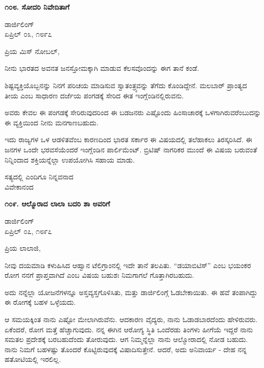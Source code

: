\begin{center}
\textbf{೧೦೮. ಸೋದರಿ ನಿವೇದಿತಾಗೆ}
\end{center}

\begin{flushright}
ಡಾರ್ಜಿಲಿಂಗ್\\ಏಪ್ರಿಲ್ ೦೩, ೧೮೯೭
\end{flushright}

ಪ್ರಿಯ ಮಿಸ್ ನೋಬಲ್,

ನೀನು ಭಾರತದ ಅವನತ ಜನಸ್ತೋಮಕ್ಕಾಗಿ ಮಾಡುವ ಕೆಲಸವೊಂದನ್ನು ಈಗ ತಾನೆ ಕಂಡೆ.

ಶಿಷ್ಟವ್ಯಕ್ತಿಯೊಬ್ಬನನ್ನು ನಿನಗೆ ಪರಿಚಯ ಮಾಡಿಸುವ ಸ್ವಾತಂತ್ರ್ಯವನ್ನು ತೆಗೆದು ಕೊಂಡಿದ್ದೇನೆ. ಮಲಬಾರ್ ಪ್ರಾಂತ್ಯದ ತೀಯ ಎಂಬ ಸಾಧಾರಣ ದರ್ಜೆಯ ಪಂಗಡಕ್ಕೆ ಸೇರಿದ ಈತ ಇಂಗ್ಲೆಂಡಿನಲ್ಲಿರುವನು.

ಅವರು ಕೇವಲ ಈ ಪಂಗಡಕ್ಕೆ ಸೇರಿರುವುದರಿಂದ ಈ ಬಡಜನರು ಎಷ್ಟೊಂದು ಹಿಂಸಾಚಾರಕ್ಕೆ ಒಳಗಾಗಿರುವರೆಂಬುದನ್ನು ಈ ವ್ಯಕ್ತಿಯಿಂದ ನೀನು ಮನಗಾಣಬಹುದು.

ಇದು ರಾಜ್ಯಗಳ ಒಳ ಆಡಳಿತವೆಂಬ ಕಾರಣದಿಂದ ಭಾರತ ಸರ್ಕಾರ ಈ ವಿಷಯದಲ್ಲಿ ತಲೆಹಾಕಲು ತಿರಸ್ಕರಿಸಿದೆ. ಈ ಜನಗಳ ಒಂದೇ ಭರವಸೆಯೆಂದರೆ ಇಂಗ್ಲೆಂಡಿನ ಪಾರ್ಲಿಮೆಂಟ್. ಬ್ರಿಟಿಷ್ ನಾಗರಿಕರ ಮುಂದೆ ಈ ವಿಷಯ ಬರುವಂತೆ ನಿನ್ನಿಂದಾದ ಶಕ್ತಿಯನ್ನೆಲ್ಲಾ ಉಪಯೋಗಿಸಿ ಸಹಾಯ ಮಾಡು.

\begin{flushright}
ಸತ್ಯದಲ್ಲಿ ಎಂದಿಗೂ ನಿನ್ನವನಾದ\\ವಿವೇಕಾನಂದ
\end{flushright}

\begin{center}
\textbf{೧೦೯. ಆಲ್ಮೊರಾದ ಲಾಲಾ ಬದರಿ ಶಾ ಅವರಿಗೆ}
\end{center}

\begin{flushright}
ಡಾರ್ಜಿಲಿಂಗ್\\ಏಪ್ರಿಲ್ ೦೭, ೧೮೯೭
\end{flushright}

ಪ್ರಿಯ ಲಾಲಾಜಿ,

ನೀವು ದಯಮಾಡಿ ಕಳುಹಿಸಿದ ಆಹ್ವಾನ ಟೆಲಿಗ್ರಾಂನಲ್ಲಿ ಇದೇ ತಾನೆ ತಲಪಿತು. “ಡಯಾಬಿಟಿಸ್” ಎಂಬ ಭಯಂಕರ ರೋಗ ನನಗೆ ಪ್ರಾಪ್ತವಾಗಿದೆ ಎಂಬ ವಿಷಯ ಬಹುಶಃ ನಿಮಗಾಗಲೆ ಗೊತ್ತಾಗಿರಬಹುದು.

ಅದು ನನ್ನೆಲ್ಲಾ ಯೋಜನೆಗಳನ್ನೂ ಅಸ್ತವ್ಯಸ್ತಗೊಳಿಸಿತು, ಮತ್ತು ಡಾರ್ಜಿಲಿಂಗ್ಗೆ ಓಡಬೇಕಾಯಿತು. ಈ ಹವೆ ತಂಪಾಗಿದ್ದು ಈ ರೋಗಕ್ಕೆ ಬಹಳ ಒಳ್ಳೆಯದು.

ಆ ಸಮಯಕ್ಕಿಂತ ನಾನು ಎಷ್ಟೋ ಮೇಲಾಗಿರುವೆನು. ಆದಕಾರಣ ವೈದ್ಯರು, ನಾನು ಓಡಾಡಬಾರದೆಂದು ಹೇಳಿರುವರು. ಏಕೆಂದರೆ, ರೋಗ ಮತ್ತೆ ಹೆಚ್ಚಾಗುವುದು. ನನ್ನ ಈಗಿನ ಆರೋಗ್ಯ ಸ್ಥಿತಿ ಒಂದೆರಡು ತಿಂಗಳು ಹೀಗೆಯೆ ಇದ್ದರೆ ನಾನು ಸಮತಲ ಪ್ರದೇಶಕ್ಕೆ ಬರಬಹುದೆಂದು ತೋರುವುದು. ಆಗ ನಿಮ್ಮನ್ನೆಲ್ಲಾ ನಾನು ಆಲ್ಮೋರಾದಲ್ಲಿ ನೋಡ ಬಹುದು. ನಾನು ನಿಮಗೆ ಬಹಳಷ್ಟು ತೊಂದರೆ ಕೊಟ್ಟಿರುವುದಕ್ಕೆ ವಿಷಾದಿಸುತ್ತೇನೆ. ಆದರೆ, ಅದು ಅನಿವಾರ್ಯ - ದೇಹ ನನ್ನ ಹತೋಟಿಯಲ್ಲಿ ಇರಲಿಲ್ಲ.

